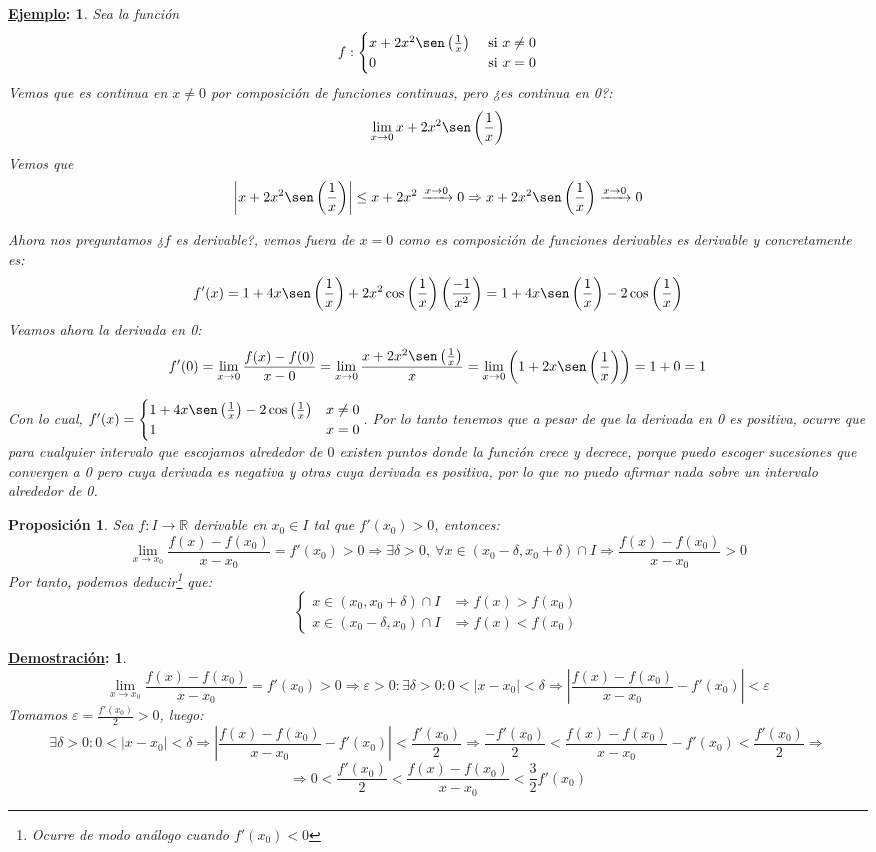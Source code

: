 \documentclass[10pt,a4paper,openright]{book}
\theoremstyle{break}
\newtheorem*{prop}{Proposición}
\newtheorem*{demo}{\underline{Demostración}:}
\newtheorem*{ej}{\underline{Ejemplo}:}
\begin{document}
\begin{ej}
Sea la función
$$f:\begin{cases}x+2x^2 \sen\left(\frac{1}{x}\right) & \mbox{ si }x\neq 0\\ 0 &\mbox{ si }x=0 \end{cases}$$
Vemos que es continua en $x\neq 0$ por composición de funciones continuas, pero ¿es continua en 0?:
$$\lim_{x\rightarrow 0} x+2x^2 \sen\left(\frac{1}{x}\right)$$
Vemos que
$$\left|x+2x^2 \sen\left(\frac{1}{x}\right)\right|\leq x+2x^2\xrightarrow{x\rightarrow 0} 0\Rightarrow x+2x^2 \sen\left(\frac{1}{x}\right)\xrightarrow{x\rightarrow 0}0$$ 

Ahora nos preguntamos ¿$f$ es derivable?, vemos fuera de $x=0$ como es composición de funciones derivables es derivable y concretamente es:
$$f'(x)=1+4x\sen\left(\frac{1}{x}\right)+2x^2\cos\left(\frac{1}{x}\right)\left(\frac{-1}{x^2}\right)=1+4x\sen\left(\frac{1}{x}\right)-2\cos\left(\frac{1}{x}\right)$$
Veamos ahora la derivada en 0:
$$f'(0)=\lim_{x\rightarrow 0}\frac{f(x)-f(0)}{x-0}=\lim_{x\rightarrow 0}\frac{x+2x^2\sen\left(\frac{1}{x}\right)}{x}=\lim_{x\rightarrow 0 }\left(1+2x\sen\left(\frac{1}{x}\right)\right)=1+0=1$$

Con lo cual, $f'(x)=\begin{cases}1+4x\sen\left(\frac{1}{x}\right)-2\cos\left(\frac{1}{x}\right) & x\neq 0\\ 1 & x=0\end{cases}$. Por lo tanto tenemos que a pesar de que la derivada en 0 es positiva, ocurre que para cualquier intervalo que escojamos alrededor de $0$ existen puntos donde la función crece y decrece, porque puedo escoger sucesiones que convergen a 0 pero cuya derivada es negativa y otras cuya derivada es positiva, por lo que no puedo afirmar nada sobre un intervalo alrededor de 0.
\end{ej}

\begin{prop}
Sea $f:I\rightarrow\mathbb R$ derivable en $x_0\in I$ tal que $f'(x_0)>0$, entonces:
$$\lim_{x\rightarrow x_0}\frac{f(x)-f(x_0)}{x-x_0}=f'(x_0)>0\Rightarrow \exists \delta>0, \ \forall x\in (x_0-\delta, x_0+\delta)\cap I\Rightarrow \frac{f(x)-f(x_0)}{x-x_0}>0$$
Por tanto, podemos deducir\footnote{Ocurre de modo análogo cuando $f'(x_0)<0$} que:
$$\begin{cases} x\in (x_0,x_0+\delta)\cap I &\Rightarrow f(x)>f(x_0)\\
x\in (x_0-\delta,x_0)\cap I & \Rightarrow f(x)<f(x_0)\end{cases}$$
\end{prop}
\begin{demo}
$$\lim_{x\rightarrow x_0}\frac{f(x)-f(x_0)}{x-x_0}=f'(x_0)>0\Rightarrow \varepsilon>0: \exists \delta>0 : 0<|x-x_0|<\delta\Rightarrow \left|\frac{f(x)-f(x_0)}{x-x_0} - f'(x_0)\right|<\varepsilon$$
Tomamos $\varepsilon = \frac{f'(x_0)}{2}>0$, luego:
$$\exists \delta>0 : 0<|x-x_0|<\delta\Rightarrow \left|\frac{f(x)-f(x_0)}{x-x_0} - f'(x_0)\right|<\frac{f'(x_0)}{2}\Rightarrow \frac{-f'(x_0)}{2}< \frac{f(x)-f(x_0)}{x-x_0} - f'(x_0)< \frac{f'(x_0)}{2}\Rightarrow $$
$$\Rightarrow 0< \frac{f'(x_0)}{2} <\frac{f(x)-f(x_0)}{x-x_0}<\frac{3}{2}f'(x_0)$$
\end{demo}
\end{document}
